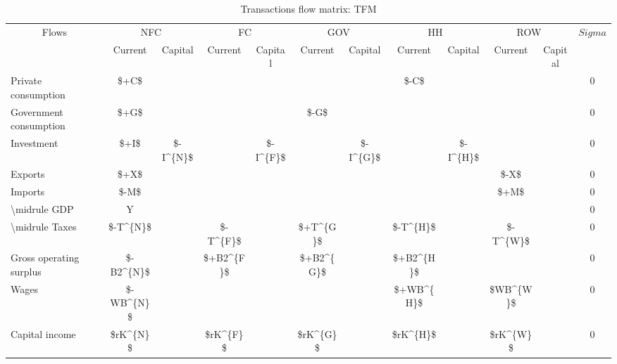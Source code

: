 \documentclass[
]{book}
\begin{document}
\begin{table}

\caption{\label{tab:sfc-fi-fl-TFM}Transactions flow matrix: TFM}
\centering
\fontsize{10}{12}\selectfont
\begin{tabular}[t]{l|c|c|c|c|c|c|c|c|c|c|c}
\hline
\multicolumn{1}{c|}{Flows} & \multicolumn{2}{c|}{NFC} & \multicolumn{2}{c|}{FC} & \multicolumn{2}{c|}{GOV} & \multicolumn{2}{c|}{HH} & \multicolumn{2}{c|}{ROW} & \multicolumn{1}{c}{$Sigma$} \\
\cline{1-1} \cline{2-3} \cline{4-5} \cline{6-7} \cline{8-9} \cline{10-11} \cline{12-12}
\multicolumn{1}{c|}{ } & \multicolumn{1}{c|}{Current} & \multicolumn{1}{c|}{Capital} & \multicolumn{1}{c|}{Current} & \multicolumn{1}{c|}{Capital} & \multicolumn{1}{c|}{Current} & \multicolumn{1}{c|}{Capital} & \multicolumn{1}{c|}{Current} & \multicolumn{1}{c|}{Capital} & \multicolumn{1}{c|}{Current} & \multicolumn{1}{c|}{Capital} & \multicolumn{1}{c}{ } \\
\cline{2-2} \cline{3-3} \cline{4-4} \cline{5-5} \cline{6-6} \cline{7-7} \cline{8-8} \cline{9-9} \cline{10-10} \cline{11-11}
Private consumption & \$+C\$ &  &  &  &  &  & \$-C\$ &  &  &  & 0\\
\hline
Government consumption & \$+G\$ &  &  &  & \$-G\$ &  &  &  &  &  & 0\\
\hline
Investment & \$+I\$ & \$-I\textasciicircum{}\{N\}\$ &  & \$-I\textasciicircum{}\{F\}\$ &  & \$-I\textasciicircum{}\{G\}\$ &  & \$-I\textasciicircum{}\{H\}\$ &  &  & 0\\
\hline
Exports & \$+X\$ &  &  &  &  &  &  &  & \$-X\$ &  & 0\\
\hline
Imports & \$-M\$ &  &  &  &  &  &  &  & \$+M\$ &  & 0\\
\hline
\textbackslash{}midrule GDP & Y &  &  &  &  &  &  &  &  &  & 0\\
\hline
\textbackslash{}midrule Taxes & \$-T\textasciicircum{}\{N\}\$ &  & \$-T\textasciicircum{}\{F\}\$ &  & \$+T\textasciicircum{}\{G\}\$ &  & \$-T\textasciicircum{}\{H\}\$ &  & \$-T\textasciicircum{}\{W\}\$ &  & 0\\
\hline
Gross operating surplus & \$-B2\textasciicircum{}\{N\}\$ &  & \$+B2\textasciicircum{}\{F\}\$ &  & \$+B2\textasciicircum{}\{G\}\$ &  & \$+B2\textasciicircum{}\{H\}\$ &  &  &  & 0\\
\hline
Wages & \$-WB\textasciicircum{}\{N\}\$ &  &  &  &  &  & \$+WB\textasciicircum{}\{H\}\$ &  & \$WB\textasciicircum{}\{W\}\$ &  & 0\\
\hline
Capital income & \$rK\textasciicircum{}\{N\}\$ &  & \$rK\textasciicircum{}\{F\}\$ &  & \$rK\textasciicircum{}\{G\}\$ &  & \$rK\textasciicircum{}\{H\}\$ &  & \$rK\textasciicircum{}\{W\}\$ &  & 0\\

\end{tabular}
\end{table}
\end{document}
